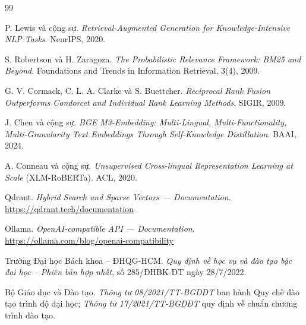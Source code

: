 
\begin{thebibliography}{99}
\setlength{\itemsep}{0.35em}

 P. Lewis và cộng sự. \emph{Retrieval-Augmented Generation for
Knowledge-Intensive NLP Tasks}. NeurIPS, 2020.

 S. Robertson và H. Zaragoza. \emph{The Probabilistic Relevance Framework: BM25
and Beyond}. Foundations and Trends in Information Retrieval, 3(4), 2009.

 G. V. Cormack, C. L. A. Clarke và S. Buettcher. \emph{Reciprocal Rank Fusion
Outperforms Condorcet and Individual Rank Learning Methods}. SIGIR, 2009.

 J. Chen và cộng sự. \emph{BGE M3-Embedding: Multi-Lingual, Multi-Functionality,
Multi-Granularity Text Embeddings Through Self-Knowledge Distillation}. BAAI, 2024.

 A. Conneau và cộng sự. \emph{Unsupervised Cross-lingual Representation Learning
at Scale} (XLM-RoBERTa). ACL, 2020.

 Qdrant. \emph{Hybrid Search and Sparse Vectors — Documentation}.
\url{https://qdrant.tech/documentation}

 Ollama. \emph{OpenAI-compatible API — Documentation}.
\url{https://ollama.com/blog/openai-compatibility}

 Trường Đại học Bách khoa – ĐHQG-HCM. \emph{Quy định về học vụ và đào tạo bậc
đại học – Phiên bản hợp nhất}, số 285/ĐHBK-ĐT ngày 28/7/2022.

 Bộ Giáo dục và Đào tạo. \emph{Thông tư 08/2021/TT-BGDĐT} ban hành Quy chế đào
tạo trình độ đại học; \emph{Thông tư 17/2021/TT-BGDĐT} quy định về chuẩn chương trình đào tạo.

\end{thebibliography}

\chapterbreak
